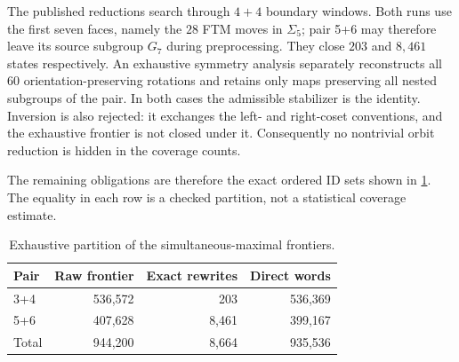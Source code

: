 The published reductions search through $4+4$ boundary windows.  Both runs
use the first seven faces, namely the $28$ FTM moves in $\Sigma_5$; pair 5+6
may therefore leave its source subgroup $G_7$ during preprocessing.  They
close $203$ and $8{,}461$ states respectively.  An
exhaustive symmetry analysis separately reconstructs all $60$
orientation-preserving rotations and retains only maps preserving all nested
subgroups of the pair.  In both cases the admissible stabilizer is the
identity.  Inversion is also rejected: it exchanges the left- and right-coset
conventions, and the exhaustive frontier is not closed under it.  Consequently
no nontrivial orbit reduction is hidden in the coverage counts.

The remaining obligations are therefore the exact ordered ID sets shown in
\cref{tab:coverage-partition}.  The equality in each row is a checked
partition, not a statistical coverage estimate.

\begin{table}[t]
\centering
\caption{Exhaustive partition of the simultaneous-maximal frontiers.}
\label{tab:coverage-partition}
\begin{tabular}{@{}lrrr@{}}
\toprule
Pair & Raw frontier & Exact rewrites & Direct words\\
\midrule
3+4 & 536,572 & 203 & 536,369\\
5+6 & 407,628 & 8,461 & 399,167\\
\midrule
Total & 944,200 & 8,664 & 935,536\\
\bottomrule
\end{tabular}
\end{table}
